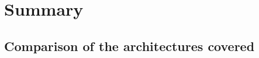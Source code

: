 \documentclass[11pt,a4paper]{article}
\begin{document}


\section{Summary}

\subsection*{Comparison of the architectures covered}
\end{document}
